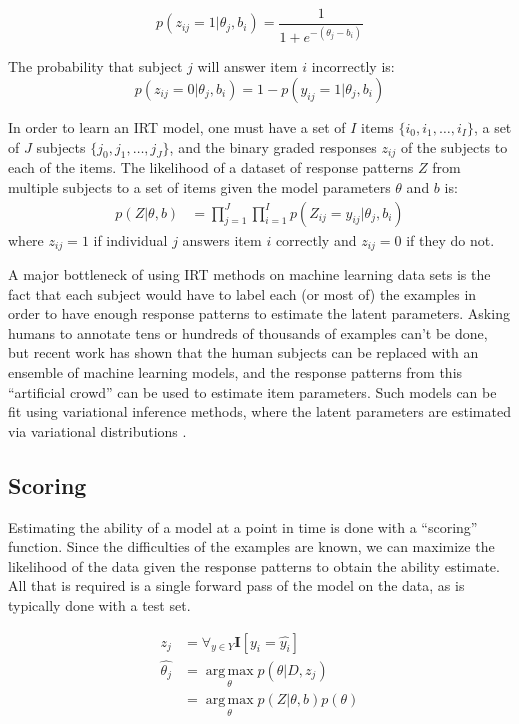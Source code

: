 \documentclass[letterpaper]{article} %
\begin{document}
\begin{equation} 
p(z_{ij} = 1 \vert \theta_j, b_i) = \frac{1}{1 + e^{-(\theta_j - b_i)}}
\end{equation}

The probability that subject $j$ will answer item $i$ incorrectly is:
\begin{equation} 
p(z_{ij} = 0 | \theta_j, b_i) = 1 - p(y_{ij} = 1 \vert \theta_j, b_i)
\end{equation} 

In order to learn an IRT model, one must have a set of $I$ items $\{i_0, i_1, \dots, i_I\}$, a set of $J$ subjects $\{j_0, j_1, \dots, j_J\}$, and the binary graded responses $z_{ij}$ of the subjects to each of the items.
The likelihood of a dataset of response patterns $Z$ from multiple subjects to a set of items given the model parameters $\theta$ and $b$ is:
\begin{align} 
p(Z \vert \theta, b) &= \prod_{j=1}^J \prod_{i=1}^I p(Z_{ij}=y_{ij} \vert \theta_j, b_i)
\end{align} 
where $z_{ij} = 1$ if individual $j$ answers item $i$ correctly and $z_{ij} = 0$ if they do not.

A major bottleneck of using IRT methods on machine learning data sets is the fact that each subject would have to label each (or most of) the examples in order to have enough response patterns to estimate the latent parameters.
Asking humans to annotate tens or hundreds of thousands of examples can't be done, but recent work has shown that the human subjects can be replaced with an ensemble of machine learning models, and the response patterns from this ``artificial crowd'' can be used to estimate item parameters.
Such models can be fit using variational inference methods, where the latent parameters are estimated via variational distributions \cite{natesan_bayesian_2016,lalor_learning_2019}. 

\subsection{Scoring}
\label{ssec:scoring}
Estimating the ability of a model at a point in time is done with a ``scoring'' function. 
Since the difficulties of the examples are known, we can maximize the likelihood of the data given the response patterns to obtain the ability estimate.
All that is required is a single forward pass of the model on the data, as is typically done with a test set. 

\begin{align}
z_j &= \forall_{y \in Y} \mathbf{I}[y_i = \hat{y_i}] \\
\hat{\theta_j} &=  \operatorname*{arg\,max}_\theta p(\theta \vert D, z_j )\\
&= \operatorname*{arg\,max}_\theta p(Z \vert \theta, b)p(\theta)
\end{align}
\end{document}
